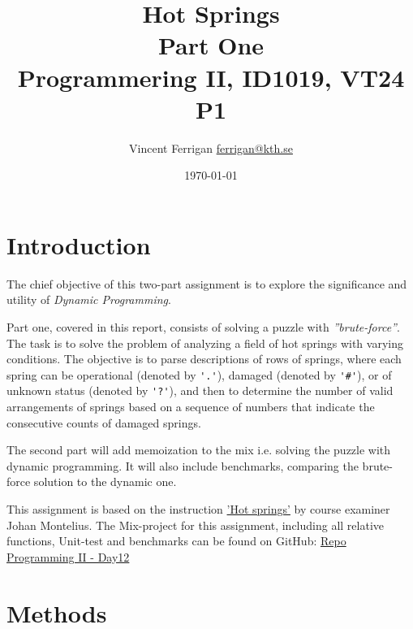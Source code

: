 \documentclass[a4paper,11pt]{article}
\begin{document}
\title{
    Hot Springs
    \\Part One
\\\small{Programmering II, ID1019, VT24 P1}
}
\author{Vincent Ferrigan \href{mailto:ferrigan@kth.se}{ferrigan@kth.se}}

\date{\today}

\maketitle

\section*{Introduction}
\label{sec:introduction}
The chief objective of this two-part assignment is to explore the significance
and utility of \emph{Dynamic Programming}.

Part one, covered in this report, consists of solving a puzzle with
\emph{''brute-force''}.
The task is to solve the problem of analyzing a field of
hot springs with varying conditions.
The objective is to parse descriptions of rows of springs,
where each spring can be operational (denoted by \verb|'.'|),
damaged (denoted by \verb|'#'|), or of unknown status (denoted by \verb|'?'|),
and then to determine the number of valid arrangements of springs
based on a sequence of numbers that indicate the consecutive counts of damaged springs.

The second part will add memoization to the mix i.e.
solving the puzzle with dynamic programming.
It will also include benchmarks, comparing the brute-force solution to the dynamic one.


This assignment is based on the instruction
\href{https://people.kth.se/~johanmon/courses/id1019/seminars/springs/springs.pdf}{'Hot springs'}
by course examiner Johan Montelius.
The Mix-project for this assignment, including all relative functions, Unit-test and benchmarks can be found on GitHub:
\href{https://github.com/VincentFerrigan/kth-id1019-programming-ii/tree/main/tasks/5/day12}{Repo Programming II - Day12}%

\section*{Methods}\label{sec:methods}
\end{document}

